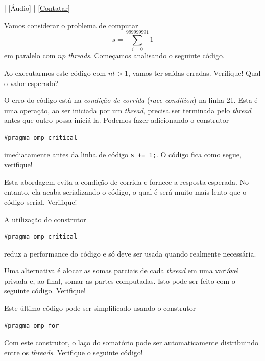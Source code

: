 \begin{flushright}
  [Vídeo] | [Áudio] | \href{https://phkonzen.github.io/notas/contato.html}{[Contatar]}
\end{flushright}

Vamos considerar o problema de computar
\begin{equation}
  s = \sum_{i=0}^{999999991} 1
\end{equation}
em paralelo com $np$ {\it threads}. Começamos analisando o seguinte código.



Ao executarmos este código com $nt > 1$, vamos ter saídas erradas. Verifique! Qual o valor esperado?

O erro do código está na \emph{condição de corrida} ({\it race condition}) na linha 21. Esta é uma operação, ao ser iniciada por um {\it thread}, precisa ser terminada pelo {\it thread} antes que outro possa iniciá-la. Podemos fazer adicionando o construtor
\begin{verbatim}
#pragma omp critical
\end{verbatim}
imediatamente antes da linha de código \verb!s += 1;!. O código fica como segue, verifique!



Esta abordagem evita a condição de corrida e fornece a resposta esperada. No entanto, ela acaba serializando o código, o qual é será muito mais lento que o código serial. Verifique!

\begin{obs}
  A utilização do construtor
\begin{verbatim}
#pragma omp critical
\end{verbatim}
  reduz a performance do código e só deve ser usada quando realmente necessária.
\end{obs}

Uma alternativa é alocar as somas parciais de cada {\it thread} em uma variável privada e, ao final, somar as partes computadas. Isto pode ser feito com o seguinte código. Verifique!



Este último código pode ser simplificado usando o construtor
\begin{verbatim}
#pragma omp for
\end{verbatim}
Com este construtor, o laço do somatório pode ser automaticamente distribuindo entre os {\it threads}. Verifique o seguinte código!

